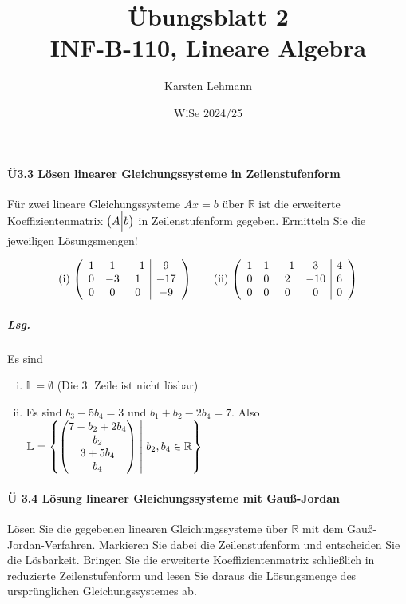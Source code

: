 \documentclass{scrreprt}
\author{Karsten Lehmann}
\date{WiSe 2024/25}
\title{Übungsblatt 2\\INF-B-110, Lineare Algebra}
\begin{document}
\paragraph{Ü3.3  Lösen linearer Gleichungssysteme in Zeilenstufenform}
Für zwei lineare Gleichungssysteme $Ax = b$ über $\mathbb{R}$ ist die erweiterte
Koeffizientenmatrix $\qty\big(A{\Big|}b)$ in Zeilenstufenform gegeben.
Ermitteln Sie die jeweiligen Lösungsmengen!

\[
  \text{(i)} \;
  \qty(
  \begin{array}{ccc|c}
    1 & 1  & -1 & 9   \\
    0 & -3 & 1  & -17 \\
    0 & 0  & 0  & -9
  \end{array}
  )
  \qquad
  \text{(ii)} \;
  \qty(
  \begin{array}{cccc|c}
    1 & 1 & -1 & 3   & 4 \\
    0 & 0 & 2  & -10 & 6 \\
    0 & 0 & 0  & 0   & 0
  \end{array})
\]

\subparagraph{Lsg.} Es sind
\begin{enumerate}[(i)]
\item $\mathbb{L} = \emptyset$ (Die 3. Zeile ist nicht lösbar)
\item
  Es sind $b_3 -5 b_4 = 3$ und $b_1 + b_2 -2 b_4 = 7$. Also
  $\mathbb{L} = \qty{\begin{pmatrix}7 - b_2 + 2b_4 \\ b_2 \\ 3 + 5b_4 \\ b_4 \end{pmatrix}
    \;\middle|\; b_2, b_4 \in \mathbb{R}}$
\end{enumerate}

\paragraph{Ü 3.4 Lösung linearer Gleichungssysteme mit Gauß-Jordan}
Lösen Sie die gegebenen linearen Gleichungssysteme über $\mathbb{R}$ mit dem
Gauß-Jordan-Verfahren.
Markieren Sie dabei die Zeilenstufenform und entscheiden Sie die Lösbarkeit.
Bringen Sie die erweiterte Koeffizientenmatrix schließlich in reduzierte
Zeilenstufenform und lesen Sie daraus die Lösungsmenge des ursprünglichen
Gleichungssystemes ab.
\end{document}
